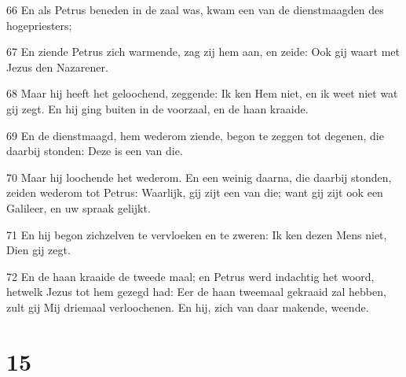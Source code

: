 \par 66 En als Petrus beneden in de zaal was, kwam een van de dienstmaagden des hogepriesters;
\par 67 En ziende Petrus zich warmende, zag zij hem aan, en zeide: Ook gij waart met Jezus den Nazarener.
\par 68 Maar hij heeft het geloochend, zeggende: Ik ken Hem niet, en ik weet niet wat gij zegt. En hij ging buiten in de voorzaal, en de haan kraaide.
\par 69 En de dienstmaagd, hem wederom ziende, begon te zeggen tot degenen, die daarbij stonden: Deze is een van die.
\par 70 Maar hij loochende het wederom. En een weinig daarna, die daarbij stonden, zeiden wederom tot Petrus: Waarlijk, gij zijt een van die; want gij zijt ook een Galileer, en uw spraak gelijkt.
\par 71 En hij begon zichzelven te vervloeken en te zweren: Ik ken dezen Mens niet, Dien gij zegt.
\par 72 En de haan kraaide de tweede maal; en Petrus werd indachtig het woord, hetwelk Jezus tot hem gezegd had: Eer de haan tweemaal gekraaid zal hebben, zult gij Mij driemaal verloochenen. En hij, zich van daar makende, weende.

\chapter{15}

